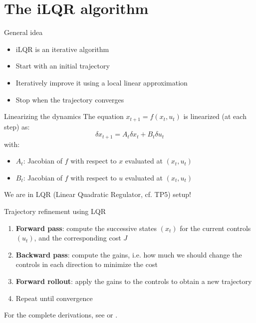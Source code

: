 \documentclass[aspectratio=169]{beamer}
\begin{document}
\section{The iLQR algorithm}
\begin{frame}{General idea}
    \begin{itemize}
        \item iLQR is an iterative algorithm
        \item Start with an initial trajectory
        \item Iteratively improve it using a local linear approximation
        \item Stop when the trajectory converges
    \end{itemize}
\end{frame}

\begin{frame}{Linearizing the dynamics}
    The equation $x_{t+1} = f(x_t, u_t)$ is linearized (at each step) as:
    \begin{equation*}
        \delta x_{t+1} = A_t \delta x_t + B_t \delta u_t
    \end{equation*}
    with:
    \begin{itemize}
        \item $A_t$: Jacobian of $f$ with respect to $x$ evaluated at $(x_t, u_t)$
        \item $B_t$: Jacobian of $f$ with respect to $u$ evaluated at $(x_t, u_t)$
    \end{itemize}
    We are in LQR (Linear Quadratic Regulator, cf. TP5) setup!
\end{frame}

\begin{frame}{Trajectory refinement using LQR}
    \begin{enumerate}
        \item \textbf{Forward pass}: compute the successive states $(x_t)$ for the current controls $(u_t)$, and the corresponding cost $J$
        \item \textbf{Backward pass}: compute the gains, i.e. how much we should change the controls in each direction to minimize the cost
        \item \textbf{Forward rollout}: apply the gains to the controls to obtain a new trajectory
        \item Repeat until convergence
    \end{enumerate}
    \vspace*{1cm}
    For the complete derivations, see \cite{jackson2019ilqr} or \cite{harley2020ilqr}.
\end{frame}
\end{document}
